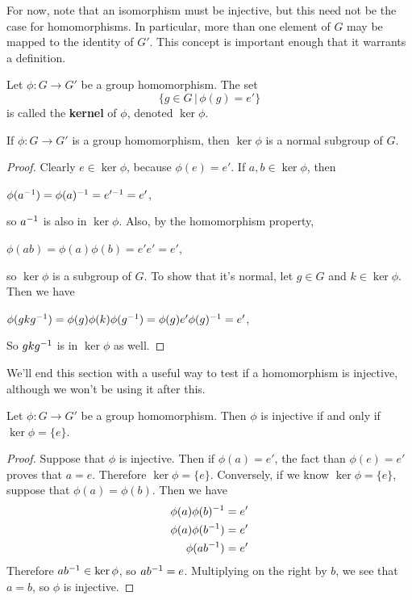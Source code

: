 For now, note that an isomorphism must be injective, but this need not be the case for homomorphisms. In particular, more than one element of $G$ may be mapped to the identity of $G'$. This concept is important enough that it warrants a definition.

\begin{definition}
Let $\phi: G \to G'$ be a group homomorphism. The set
\begin{equation*}
    \{g \in G \,|\, \phi(g) = e'\}
\end{equation*}
is called the \textbf{kernel} of $\phi$, denoted $\ker \phi$.
\end{definition}

\begin{theorem}
\label{normalkernel}
If $\phi: G \to G'$ is a group homomorphism, then $\ker\phi$ is a normal subgroup of $G$.
\end{theorem}

\begin{proof}
Clearly $e \in \ker\phi$, because $\phi(e) = e'$. If $a, b \in \ker\phi$, then
\begin{center}
    $\phi(a^{-1}) = \phi(a)^{-1} = e'^{-1} = e'$,
\end{center}
so $a^{-1}$ is also in $\ker\phi$. Also, by the homomorphism property,
\begin{center}
    $\phi(ab) = \phi(a)\phi(b) = e'e' = e'$,
\end{center}
so $\ker\phi$ is a subgroup of $G$. To show that it's normal, let $g \in G$ and $k \in \ker\phi$. Then we have
\begin{center}
    $\phi(gkg^{-1}) = \phi(g)\phi(k)\phi(g^{-1}) = \phi(g) e' \phi(g)^{-1} = e'$,
\end{center}
So $gkg^{-1}$ is in $\ker\phi$ as well.

\end{proof}

We'll end this section with a useful way to test if a homomorphism is injective, although we won't be using it after this.

\begin{theorem}
Let \extra $\phi: G \to G'$ be a group homomorphism. Then $\phi$ is injective if and only if $\ker \phi = \{e\}$.
\end{theorem}

\begin{proof}
Suppose that $\phi$ is injective. Then if $\phi(a) = e'$, the fact than $\phi(e) = e'$ proves that $a = e$. Therefore $\ker\phi = \{e\}$. Conversely, if we know $\ker\phi = \{e\}$, suppose that $\phi(a) = \phi(b)$. Then we have
\begin{align*}
    \phi(a)\phi(b)^{-1} &= e' \\
    \phi(a)\phi(b^{-1}) &= e' \\
    \phi(a b^{-1}) &= e' \\
\end{align*}
Therefore $ab^{-1} \in \ker\phi$, so $ab^{-1} = e$. Multiplying on the right by $b$, we see that $a = b$, so $\phi$ is injective.
\end{proof}

